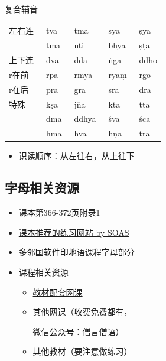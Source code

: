\documentclass[17pt]{beamer}
\newcommand{\skt}[1]{{\sanskritfont{#1}}} %
\newcommand{\skttrans}[1]{{\skt{#1}~#1}}  %
\begin{document}
\begin{frame}{复合辅音}
  \small
  {\centering
    \begin{tabular}{@{}lllll@{}} %
      左右连 & \skttrans{tva}  & \skttrans{tma} & \skttrans{sya} & \skttrans{ṣya} \\
      & \skttrans{tma}  & \skttrans{nti} & \skttrans{bhya} & \skttrans{ṣṭa}   \\
      上下连  & \skttrans{dva}  & \skttrans{dda} & \skttrans{ṅga} & \skttrans{ddho} \\
      r在前 & \skttrans{rpa}  & \skttrans{rmya} & \skttrans{ryāṃ} & \skttrans{rgo} \\
      r在后  & \skttrans{pra}  & \skttrans{gra} & \skttrans{sra} & \skttrans{dra} \\
      特殊  & \skttrans{kṣa}  & \skttrans{jña} & \skttrans{kta} & \skttrans{tta} \\
        & \skttrans{dma}  & \skttrans{ddhya} & \skttrans{śva} & \skttrans{śca} \\
        & \skttrans{hma}  & \skttrans{hva} & \skttrans{hṇa} & \skttrans{tra} \\
    \end{tabular}
  }
  \begin{itemize}
    \item
      识读顺序：从左往右，从上往下
  \end{itemize}
\end{frame}

\subsection{字母相关资源}
\begin{frame}{\insertsubsection }
  \begin{itemize}
    \item
      课本第366-372页附录1
    \item
      \href{https://hindibhasha.com/hindiscripttutor.htm}{课本推荐的练习网站 by SOAS}
    \item
      多邻国软件印地语课程字母部分
    \item 
      课程相关资源 

      \begin{itemize}
        \item
          \href{https://www.youtube.com/playlist?list=PLWC1FN5zLbvrvsTc2zYyk5rumP-7R55Bw}{教材配套网课}
        \item
          其他网课（收费免费都有，

          微信公众号：僧言僧语）
        \item
          其他教材（要注意做练习）
      \end{itemize}
  \end{itemize}
\end{frame}  
\end{document}
